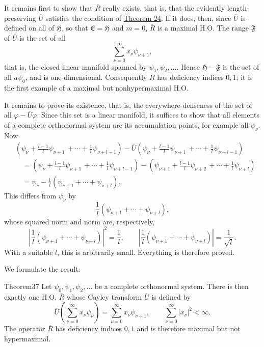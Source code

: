 ﻿\documentclass[paper=b5,fontsize=13pt,bookmarkpackage=false,twoside]{scrartcl}
\newcounter{translatornote}
\begin{document}
It remains first to show that $\overline R$ really exists, that is, that the evidently length-preserving $\overline U$ satisfies the condition of \hyperref[thm:24]{Theorem 24}. If it does, then, since $\overline U$ is defined on all of $\mathfrak H$, so that $\mathfrak E=\mathfrak H$ and $m=0$, $\overline R$ is a maximal H.O. The range $\mathfrak F$ of $\overline U$ is the set of all
\[
\sum_{\nu=0}^{\infty}x_\nu\psi_{\nu+1},
\]
that is, the closed linear manifold spanned by $\psi_1,\psi_2,\ldots$. Hence $\mathfrak H-\mathfrak F$ is the set of all $a\psi_0$, and is one-dimensional. Consequently $\overline R$ has deficiency indices $0,1$; it is the first example of a maximal but nonhypermaximal H.O.

It remains to prove its existence, that is, the everywhere-denseness of the set of all $\varphi-\overline U\varphi$. Since this set is a linear manifold, it suffices to show that all elements of a complete orthonormal system are its accumulation points, for example all $\psi_\nu$. Now
\begin{align*}
&\left(
\psi_\nu+\frac{l-1}{l}\psi_{\nu+1}
\,+\cdots+\frac1l\psi_{\nu+l-1}
\right)
-\overline U\left(
\psi_\nu+\frac{l-1}{l}\psi_{\nu+1}
\,+\cdots+\frac1l\psi_{\nu+l-1}
\right)\\
&\quad=
\left(
\psi_\nu+\frac{l-1}{l}\psi_{\nu+1}
\,+\cdots+\frac1l\psi_{\nu+l-1}
\right)
-
\left(
\psi_{\nu+1}+\frac{l-1}{l}\psi_{\nu+2}
\,+\cdots+\frac1l\psi_{\nu+l}
\right)\\
&\quad=
\psi_\nu-\frac1l(\psi_{\nu+1}+\cdots+\psi_{\nu+l}).
\end{align*}
This differs from $\psi_\nu$ by
\[
\frac1l(\psi_{\nu+1}+\cdots+\psi_{\nu+l}),
\]
whose squared norm and norm are, respectively,
\[
\left|\frac1l(\psi_{\nu+1}+\cdots+\psi_{\nu+l})\right|^2
=\frac1l,
\qquad
\left|\frac1l(\psi_{\nu+1}+\cdots+\psi_{\nu+l})\right|
=\frac1{\sqrt l}.
\]
With a suitable $l$, this is arbitrarily small. Everything is therefore proved.

We formulate the result:

\begin{namedstatement}{Theorem}{37}\label{thm:37}
Let $\psi_0,\psi_1,\psi_2,\ldots$ be a complete orthonormal system. There is then exactly one H.O. $\overline R$ whose Cayley transform $\overline U$ is defined by
\[
\overline U\left(\sum_{\nu=0}^{\infty}x_\nu\psi_\nu\right)
=
\sum_{\nu=0}^{\infty}x_\nu\psi_{\nu+1},
\qquad
\sum_{\nu=0}^{\infty}|x_\nu|^2<\infty.
\]
The operator $\overline R$ has deficiency indices $0,1$ and is therefore maximal but not hypermaximal.
\end{namedstatement}
\end{document}
